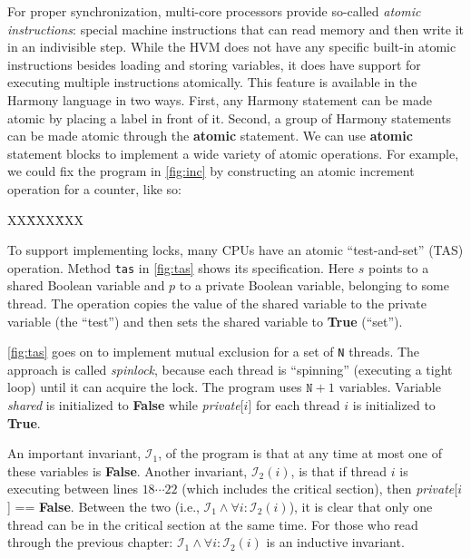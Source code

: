 \documentclass{report}
\newcommand{\harmonysource}[1]{
\begin{tabbing}
XX\=XXX\=XXX\kill
    
\end{tabbing}
}
\newenvironment{code}{
\tcolorbox
}{
\endtcolorbox
}
\begin{document}
%
For proper synchronization, multi-core processors provide so-called
\emph{atomic instructions}: %
special machine instructions
that can read memory and then write it in an indivisible step.
%
While the HVM does not have any specific built-in atomic instructions
besides loading and storing variables,
it does have support for executing multiple instructions atomically.
This feature is available in the Harmony language in two ways.
First, any Harmony statement can be made atomic by placing a label in front
of it.  Second, a group of Harmony statements can be made atomic
through the \textbf{atomic}
%
statement.
We can use \textbf{atomic} statement blocks to implement a wide variety of
atomic operations.
For example, we could fix the program in \autoref{fig:inc} by
constructing an atomic increment operation for a counter, like so:
\begin{code}
\harmonysource{atomicinc}
\end{code}

To support implementing locks,
many CPUs have an atomic ``test-and-set'' (TAS)
%
%
operation.
Method \texttt{tas} in \autoref{fig:tas} shows its specification.
Here $s$ points to a shared Boolean variable and $p$
to a private Boolean variable, belonging to some thread.
The operation copies the value of the shared variable to the
private variable (the ``test'')
and then sets the shared variable to \textbf{True} (``set'').

\autoref{fig:tas} goes on to implement mutual exclusion for
a set of \texttt{N} threads.
The approach is called \emph{spinlock},
%
because each thread is ``spinning'' (executing a tight loop) until
it can acquire the lock.
The program uses $\mathtt{N}+1$ variables.
Variable \textit{shared} is initialized to \textbf{False} while
\textit{private}[$i$] for each thread $i$ is initialized to \textbf{True}.

An important invariant, $\mathcal{I}_1$, of the program is that at any time at most
one of these variables is \textbf{False}.
Another invariant, $\mathcal{I}_2(i)$, is that if thread $i$ is executing between
lines $18 \cdots 22$ (which includes the critical section),
then \textit{private}[$i$] == \textbf{False}.
Between the two (i.e., $\mathcal{I}_1 \land \forall i: \mathcal{I}_2(i)$),
it is clear that only one thread can be in the
critical section at the same time.
For those who read through the previous chapter:
$\mathcal{I}_1 \land \forall i: \mathcal{I}_2(i)$ is an inductive invariant.
\end{document}
